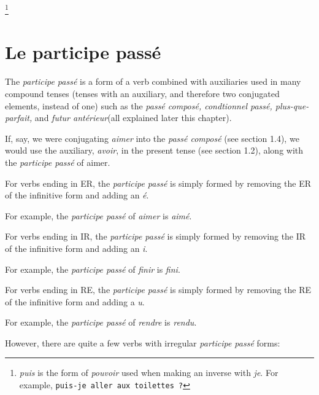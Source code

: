 \documentclass[11pt, oneside]{book}
\begin{document}
	{\let\thefootnote\relax\footnote{\textit{puis} is the form of \textit{pouvoir} used when making an inverse with \textit{je}. For example, \texttt{puis-je aller aux toilettes ?}}

\section{Le participe pass\'e}

The \textit{participe pass\'e} is a form of a verb combined with auxiliaries used in many compound tenses (tenses with an auxiliary, and therefore two conjugated elements, instead of one) such as the \textit{pass\'e compos\'e, condtionnel pass\'e, plus-que-parfait,} and \textit{futur ant\'erieur}(all explained later this chapter). 

If, say, we were conjugating \textit{aimer} into the \textit{pass\'e compos\'e} (see section 1.4), we would use the auxiliary, \textit{avoir}, in the present tense (see section 1.2), along with the \textit{participe pass\'e} of {aimer}. \vspace{0.5\baselineskip}

For verbs ending in ER, the \textit{participe pass\'e} is simply formed by removing the ER of the infinitive form and adding an \textit{\'e}. \vspace{0.5\baselineskip}

For example, the \textit{participe pass\'e} of \textit{aimer} is \textit{aimé}. \vspace{0.5\baselineskip}

For verbs ending in IR, the \textit{participe pass\'e} is simply formed by removing the IR of the infinitive form and adding an \textit{i}. \vspace{0.5\baselineskip}

For example, the \textit{participe pass\'e} of \textit{finir} is \textit{fini}.\vspace{0.5\baselineskip}

For verbs ending in RE, the \textit{participe passé} is simply formed by removing the RE of the infinitive form and adding a \textit{u}. \vspace{0.5\baselineskip}

For example, the \textit{participe pass\'e} of \textit{rendre} is \textit{rendu}.  \vspace{0.5\baselineskip}

However, there are quite a few verbs with irregular \textit{participe pass\'e} forms: \vspace{0.5\baselineskip}


}
\end{document}
